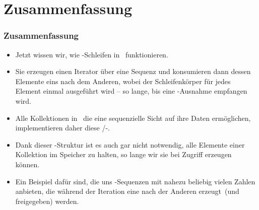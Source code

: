 \documentclass[aspectratio=169,mathserif,notheorems]{beamer}%
\begin{document}
\section{Zusammenfassung}%
%
\begin{frame}%
\frametitle{Zusammenfassung}%
\begin{itemize}%
\item Jetzt wissen wir, wie -Schleifen in \python\ funktionieren.%
%
\item<2-> Sie erzeugen einen Iterator über eine Sequenz und konsumieren dann dessen Elemente eins nach dem Anderen, wobei der Schleifenkörper für jedes Element einmal ausgeführt wird -- so lange, bis eine -Ausnahme empfangen wird.%
%
\item<3-> Alle Kollektionen in \python\ die eine sequenzielle Sicht auf ihre Daten ermöglichen, implementieren daher diese /-.%
%
\item<4-> Dank dieser -Struktur ist es auch gar nicht notwendig, alle Elemente einer Kollektion im Speicher zu halten, so lange wir sie bei Zugriff erzeugen können.%
%
\item<5-> Ein Beispiel dafür sind, die uns -Sequenzen mit nahezu beliebig vielen Zahlen anbieten, die während der Iteration eine nach der Anderen erzeugt~(und freigegeben) werden.%
\end{itemize}%
\end{frame}%
%
\endPresentation%
\end{document}
